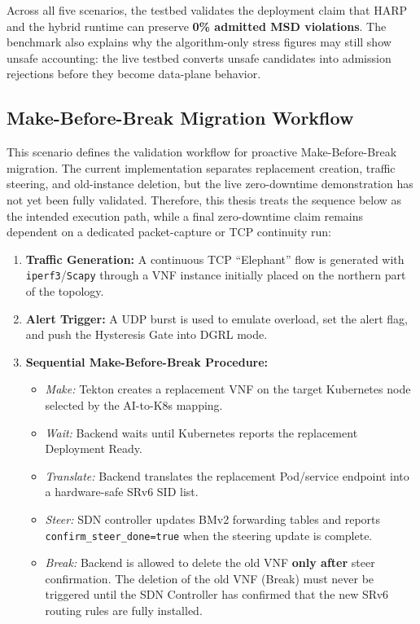\documentclass[12pt, a4paper, reqno, oneside]{book}
\begin{document}
Across all five scenarios, the testbed validates the deployment claim that HARP and the hybrid runtime can preserve \textbf{0\% admitted MSD violations}. The benchmark also explains why the algorithm-only stress figures may still show unsafe accounting: the live testbed converts unsafe candidates into admission rejections before they become data-plane behavior.

\subsection{Make-Before-Break Migration Workflow}
This scenario defines the validation workflow for proactive Make-Before-Break migration. The current implementation separates replacement creation, traffic steering, and old-instance deletion, but the live zero-downtime demonstration has not yet been fully validated. Therefore, this thesis treats the sequence below as the intended execution path, while a final zero-downtime claim remains dependent on a dedicated packet-capture or TCP continuity run:
\begin{enumerate}
    \item \textbf{Traffic Generation:} A continuous TCP ``Elephant'' flow is generated with \texttt{iperf3}/\texttt{Scapy} through a VNF instance initially placed on the northern part of the topology.
    \item \textbf{Alert Trigger:} A UDP burst is used to emulate overload, set the alert flag, and push the Hysteresis Gate into DGRL mode.
    \item \textbf{Sequential Make-Before-Break Procedure:}
    \begin{itemize}
        \item \textit{Make:} Tekton creates a replacement VNF on the target Kubernetes node selected by the AI-to-K8s mapping.
        \item \textit{Wait:} Backend waits until Kubernetes reports the replacement Deployment Ready.
        \item \textit{Translate:} Backend translates the replacement Pod/service endpoint into a hardware-safe SRv6 SID list.
        \item \textit{Steer:} SDN controller updates BMv2 forwarding tables and reports \texttt{confirm\_steer\_done=true} when the steering update is complete.
        \item \textit{Break:} Backend is allowed to delete the old VNF \textbf{only after} steer confirmation. The deletion of the old VNF (Break) must never be triggered until the SDN Controller has confirmed that the new SRv6 routing rules are fully installed.
    \end{itemize}
\end{enumerate}
\end{document}
